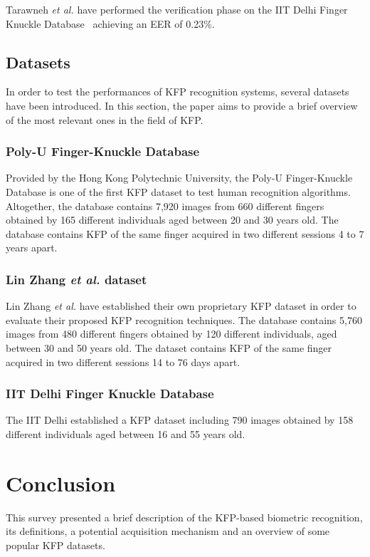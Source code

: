 \documentclass[journal]{IEEEtran}
\begin{document}
Tarawneh \textit{et al.} have performed the verification phase on the IIT Delhi Finger Knuckle Database~\cite{delhi} achieving an EER of 0.23\%.

\subsection{Datasets}
In order to test the performances of KFP recognition systems, several datasets have been introduced. In this section, the paper aims to provide a brief overview of the most relevant ones in the field of KFP.

\subsubsection{\texorpdfstring{Poly-U Finger-Knuckle Database~\cite{polyu1}}{Poly-U Finger-Knuckle Database}}
Provided by the Hong Kong Polytechnic University, the Poly-U Finger-Knuckle Database is one of the first KFP dataset to test human recognition algorithms. Altogether, the database contains 7,920 images from 660 different fingers obtained by 165 different individuals aged between 20 and 30 years old. The database contains KFP of the same finger acquired in two different sessions 4 to 7 years apart.

\subsubsection{\texorpdfstring{Lin Zhang \textit{et al.} dataset~\cite{ZHANG20111990}}{Lin Zhang \textit{et al.} dataset}}
Lin Zhang \textit{et al.} have established their own proprietary KFP dataset in order to evaluate their proposed KFP recognition techniques. The database contains 5,760 images from 480 different fingers obtained by 120 different individuals, aged between 30 and 50 years old. The dataset contains KFP of the same finger acquired in two different sessions 14 to 76 days apart.

\subsubsection{\texorpdfstring{IIT Delhi Finger Knuckle Database~\cite{delhi}}{IIT Delhi Finger Knuckle Database}}
The IIT Delhi established a KFP dataset including 790 images obtained by 158 different individuals aged between 16 and 55 years old.

\section{Conclusion}
\label{sec:conclusion}
This survey presented a brief description of the KFP-based biometric recognition, its definitions, a potential acquisition mechanism and an overview of some popular KFP datasets.
\end{document}
